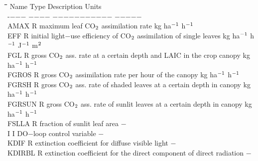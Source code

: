 \documentclass[11pt]{article}
\begin{document}
\begin{tabbing}
\hspace{1.27cm}\=\hspace{1.27cm}\=\hspace{1.27cm}\=\hspace{1.27cm}\=%
\hspace{1.27cm}\=\hspace{1.27cm}\=\hspace{1.27cm}\=\hspace{1.27cm}\=%
\hspace{1.27cm}\=\hspace{1.27cm}\=\kill
Name \> \> Type \> Description                                       \> \> \> \> \> \> \> Units\\
-$-$$-$$-$ \> \> $-$$-$$-$$-$\> $-$$-$$-$$-$$-$$-$$-$$-$$-$$-$$-$                                        \> \> \> \> \> \> \> $-$$-$$-$$-$$-$ \\
AMAX\> \> R   \> maximum leaf CO$_{{\rm 2}}$ assimilation rate       \> \> \> \> \> \> \> kg ha$^{{\rm -1}}$ h$^{{\rm -1}}$ \\
EFF \> \> R   \> initial light$-$use efficiency of CO$_{{\rm 2}}$ assimilation of single leaves  \> \> \> \> \> \> \> kg ha$^{{\rm -1}}$ h$^{{\rm -1}}$  J$^{{\rm -1}}$ m$^{{\rm 2}}$\\
FGL \> \> R   \> gross CO$_{{\rm 2}}$ ass. rate at a certain depth and LAIC in the crop canopy\> \> \> \> \> \> \> kg ha$^{{\rm -1}}$ h$^{{\rm -1}}$ \\
FGROS\> \> R   \> gross CO$_{{\rm 2}}$ assimilation rate per hour of the canopy \> \> \> \> \> \> \> kg ha$^{{\rm -1}}$ h$^{{\rm -1}}$ \\
FGRSH\> \> R   \> gross CO$_{{\rm 2}}$ ass. rate of shaded leaves at a certain depth in canopy \> \> \> \> \> \> \> kg ha$^{{\rm -1}}$ h$^{{\rm -1}}$ \\
FGRSUN\> \> R   \> gross CO$_{{\rm 2}}$ ass. rate of sunlit leaves at a certain depth in canopy  \> \> \> \> \> \> \> kg ha$^{{\rm -1}}$ h$^{{\rm -1}}$ \\
FSLLA   \> \> R   \> fraction of sunlit leaf area                 \> \> \> \> \> \> \> $-$\\
I       \> \> I   \> DO$-$loop control variable                    \> \> \> \> \> \> \> $-$\\
KDIF    \> \> R   \> extinction coefficient for diffuse visible light\> \> \> \> \> \> \> $-$\\
KDIRBL  \> \> R   \> extinction coefficient for the direct component of direct radiation\> \> \> \> \> \> \> $-$\\
$$
\end{tabbing}
\end{document}
